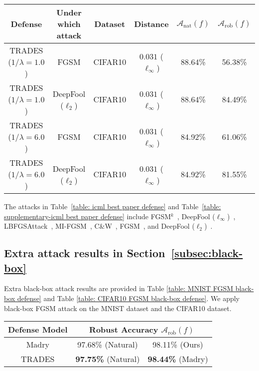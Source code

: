 \documentclass[11pt]{article}
\newcommand{\adv}{\mathrm{rob}}
\newcommand{\nat}{\mathrm{nat}}
\newcommand{\0}{\mathbf{0}}
\newcommand{\1}{\mathbf{1}}
\newcommand{\cA}{\mathcal{A}}
\begin{document}
\begin{table*}[ht]
	\caption{Results of our method TRADES under different white-box attacks.}
	\label{table: supplementary-icml best paper defense}
	\centering
\begin{tabular}{c||c|c|c|c|c}\hline
		Defense & Under which attack & Dataset & Distance & $\cA_\nat(f)$   & $\cA_\adv(f)$  
		\\
		\hline
		{TRADES} ($1/\lambda=1.0$) & FGSM  & CIFAR10 &  $0.031$ ($\ell_\infty$) & 88.64\% & 56.38\% \\
{TRADES} ($1/\lambda=1.0$) & DeepFool ($\ell_2$)  & CIFAR10 &  $0.031$ ($\ell_\infty$) & 88.64\% & 84.49\% \\
\hline
		{TRADES} ($1/\lambda=6.0$) & FGSM  & CIFAR10 &  $0.031$ ($\ell_\infty$) & 84.92\% & 61.06\% \\
{TRADES} ($1/\lambda=6.0$)  & DeepFool ($\ell_2$) & CIFAR10 &  $0.031$ ($\ell_\infty$) & 84.92\% & 81.55\% \\
\hline
	\end{tabular}
\end{table*}

The attacks in Table~\ref{table: icml best paper defense} and Table~\ref{table: supplementary-icml best paper defense} include FGSM$^k$~\cite{kurakin2016adversarial}, DeepFool ($\ell_\infty$)~\cite{moosavi2016deepfool},  LBFGSAttack~\cite{tabacof2016exploring}, MI-FGSM~\cite{dong2018boosting}, C\&W~\cite{carlini2017towards}, FGSM~\cite{kurakin2016adversarial}, and DeepFool ($\ell_2$)~\cite{moosavi2016deepfool}.

\subsection{Extra attack results in Section~\ref{subsec:black-box}}
Extra black-box attack results are provided in Table \ref{table: MNIST FGSM black-box defense} and Table \ref{table: CIFAR10 FGSM black-box defense}. We apply black-box FGSM attack on the MNIST dataset and the CIFAR10 dataset.


\begin{table*}[ht]
	\caption{Comparisons of TRADES with prior defense models under black-box FGSM attack on the MNIST dataset. The models inside parentheses are source models which provide gradients to adversarial attackers.}
	\label{table: MNIST FGSM black-box defense}
	\centering
\begin{tabular}{c||c|c}\hline
		Defense Model & \multicolumn{2}{c}{Robust Accuracy $\cA_\adv(f)$}
		\\
		\hline
		{Madry} & 97.68\% (Natural)  & 98.11\% (Ours) \\ 
		\hline
		{TRADES} & \textbf{97.75\%} (Natural) & \textbf{98.44\%} (Madry)  \\
		\hline
	\end{tabular}
\end{table*}
\end{document}
